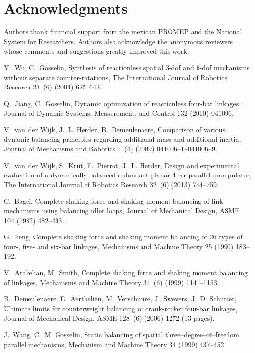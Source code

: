 \documentclass[11pt]{article}
\begin{document}
\section*{Acknowledgments}
Authors thank financial support from the mexican PROMEP and the National 
System for Researchers. Authors also acknowledge the anonymous reviewers 
whose comments and suggestions greatly improved this work.
 
 \newpage
 \begin{thebibliography}{10}


Y.~Wu, C.~Gosselin, Synthesis of reactionless spatial 3-dof and 6-dof
  mechanisms without separate counter-rotations, The International Journal of
  Robotics Research 23~(6) (2004) 625--642.

Q.~Jiang, C.~Gosselin, Dynamic optimization of reactionless four-bar linkages,
  Journal of Dynamic Systems, Measurement, and Control 132 (2010) 041006.

V.~van~der Wijk, J.~L. Herder, B.~Demeulenaere, Comparison of various dynamic
  balancing principles regarding additional mass and additional inertia,
  Journal of Mechanisms and Robotics 1~(4) (2009) 041006--1--041006--9.

V.~van~der Wijk, S.~Krut, F.~Pierrot, J.~L. Herder, Design and experimental
  evaluation of a dynamically balanced redundant planar 4-rrr parallel
  manipulator, The International Journal of Robotics Research 32~(6) (2013)
  744--759.

C.~Bagci, Complete shaking force and shaking moment balancing of link
  mechanisms using balancing idler loops, Journal of Mechanical Design, ASME
  104 (1982) 482--493.

G.~Feng, Complete shaking force and shaking moment balancing of 26 types of
  four-, five- and six-bar linkages, Mechanisms and Machine Theory 25 (1990)
  183--192.

V.~Arakelian, M.~Smith, Complete shaking force and shaking moment balancing of
  linkages, Mechanisms and Machine Theory 34~(6) (1999) 1141--1153.

B.~Demeulenaere, E.~Aertbeli\"en, M.~Verschuure, J.~Swevers, J.~D. Schutter,
  Ultimate limits for counterweight balancing of crank-rocker four-bar
  linkages, Journal of Mechanical Design, ASME 128~(6) (2006) 1272 (13 pages).

J.~Wang, C.~M. Gosselin, Static balancing of spatial three--degree--of--freedom
  parallel mechanisms, Mechanism and Machine Theory 34 (1999) 437--452.


\end{thebibliography}
\end{document}

